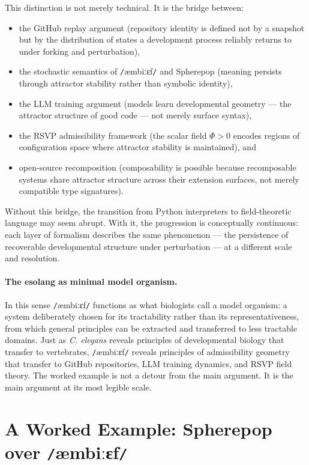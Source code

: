\documentclass[11pt]{article}
\newcommand{\ambibf}{%
  \texttt{/}\textnormal{æmbiːɛf}\texttt{/}%
}
\begin{document}
This distinction is not merely technical. It is the bridge between:
\begin{itemize}
\item the GitHub replay argument (repository identity is defined not by a
snapshot but by the distribution of states a development process reliably
returns to under forking and perturbation),
\item the stochastic semantics of \ambibf{} and Spherepop (meaning persists
through attractor stability rather than symbolic identity),
\item the LLM training argument (models learn developmental geometry ---
the attractor structure of good code --- not merely surface syntax),
\item the RSVP admissibility framework (the scalar field $\Phi > 0$ encodes
regions of configuration space where attractor stability is maintained), and
\item open-source recomposition (composability is possible because recomposable
systems share attractor structure across their extension surfaces, not merely
compatible type signatures).
\end{itemize}

Without this bridge, the transition from Python interpreters to field-theoretic
language may seem abrupt. With it, the progression is conceptually continuous:
each layer of formalism describes the same phenomenon --- the persistence of
recoverable developmental structure under perturbation --- at a different scale
and resolution.

\paragraph{The esolang as minimal model organism.}
In this sense \ambibf{} functions as what biologists call a model organism:
a system deliberately chosen for its tractability rather than its
representativeness, from which general principles can be extracted and
transferred to less tractable domains. Just as \textit{C. elegans} reveals
principles of developmental biology that transfer to vertebrates, \ambibf{}
reveals principles of admissibility geometry that transfer to GitHub repositories,
LLM training dynamics, and RSVP field theory. The worked example is not a
detour from the main argument. It is the main argument at its most legible scale.

\section[A Worked Example]{A Worked Example: Spherepop over \ambibf{}}
\label{sec:worked}
\end{document}
